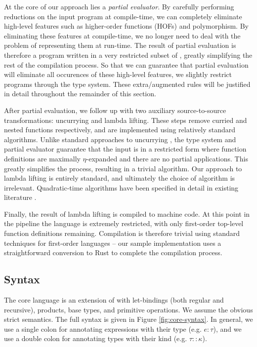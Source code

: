 \documentclass[runningheads]{llncs}
\begin{document}
At the core of our approach lies a \emph{partial evaluator}. By carefully performing reductions on the input program at compile-time, we can completely eliminate high-level features such as higher-order functions (HOFs) and polymorphism. By eliminating these features at compile-time, we no longer need to deal with the problem of representing them at run-time. The result of partial evaluation is therefore a program written in a very restricted subset of \core{}, greatly simplifying the rest of the compilation process. So that we can guarantee that partial evaluation will eliminate all occurences of these high-level features, we slightly restrict \core{} programs through the type system. These extra/augmented rules will be justified in detail throughout the remainder of this section.

After partial evaluation, we follow up with two auxiliary source-to-source transformations: uncurrying and lambda lifting. These steps remove curried and nested functions respectively, and are implemented using relatively standard algorithms. Unlike standard approaches to uncurrying \cite{hannan1998higher}, the type system and partial evaluator guarantee that the input is in a restricted form where function definitions are maximally $\eta$-expanded and there are no partial applications. This greatly simplifies the process, resulting in a trivial algorithm. Our approach to lambda lifting is entirely standard, and ultimately the choice of algorithm is irrelevant. Quadratic-time algorithms have been specified in detail in existing literature \cite{morazan2008optimal}.

Finally, the result of lambda lifting is compiled to machine code. At this point in the pipeline the language is extremely restricted, with only first-order top-level function definitions remaining. Compilation is therefore trivial using standard techniques for first-order languages -- our sample implementation uses a straightforward conversion to Rust \cite{klabnik2023rust} to complete the compilation process.

\subsection{Syntax}

The core language \core{} is an extension of \fom{} with let-bindings (both regular and recursive), products, base types, and primitive operations. We assume the obvious strict semantics. The full syntax is given in Figure \ref{fig:core-syntax}. In general, we use a single colon for annotating expressions with their type (e.g. $e : \tau$), and we use a double colon for annotating types with their kind (e.g. $\tau :: \kappa$).
\end{document}
